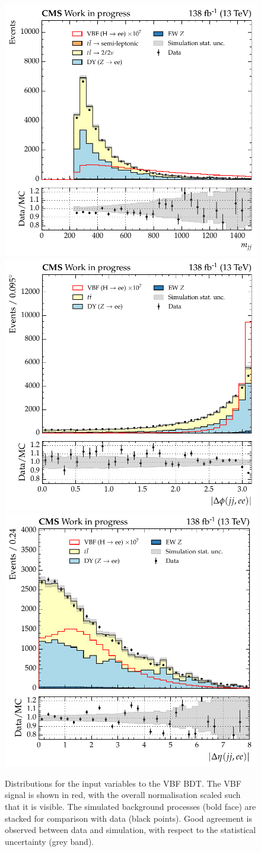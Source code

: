 \begin{figure}[htbp!]
\includegraphics[width =0.33\linewidth]{Figures/Hee/VBF/dataMC/all_inputs/VBF_BDT_dijetMass.pdf}\hfill%
\includegraphics[width =0.33\linewidth]{Figures/Hee/VBF/dataMC/all_inputs/VBF_BDT_dijetDieleAbsDPhiTrunc.pdf}\hfill%
\includegraphics[width =0.33\linewidth]{Figures/Hee/VBF/dataMC/all_inputs/VBF_BDT_dijetDieleAbsDEta.pdf}\hfill%
\caption{Distributions for the input variables to the VBF BDT. The VBF signal is shown in red, with the overall normalisation scaled such that it is visible. The simulated background processes (bold face) are stacked for comparison with data (black points). Good agreement is observed between data and simulation, with respect to the statistical uncertainty (grey band).} 
\label{fig:VBF_inputs_first}
\end{figure}
 
